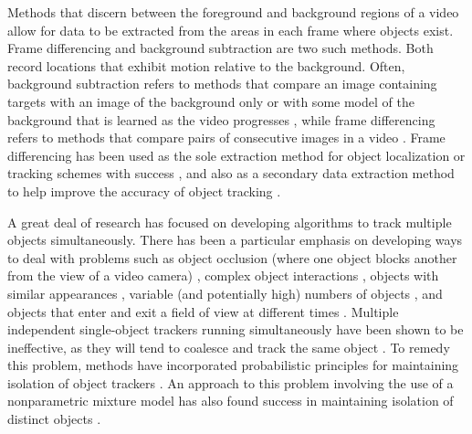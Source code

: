 \documentclass[twocolumn, final]{svjour3}
\begin{document}
Methods that discern between the foreground and background regions of a video allow for data to be extracted from the areas in each frame where objects exist. Frame differencing and background subtraction are two such methods. Both record locations that exhibit motion relative to the background. Often, background subtraction refers to methods that compare an image containing targets with an image of the background only or with some model of the background that is learned as the video progresses \cite{piccardi2004background}, while frame differencing refers to methods that compare pairs of consecutive images in a video \cite{zhang2001segmentation}. Frame differencing has been used as the sole extraction method for object localization or tracking schemes with success \citep{pece_2002, beleznai_2006, chu_2007}, and also as a secondary data extraction method to help improve the accuracy of object tracking \citep{perez_2002}.

A great deal of research has focused on developing algorithms to track multiple objects simultaneously. There has been a particular emphasis on developing ways to deal with problems such as object occlusion (where one object blocks another from the view of a video camera) \cite{senior2006appearance, cucchiara2004probabilistic, zhou2003background}, complex object interactions \cite{khan_2004, mckenna2000tracking, dockstader2001multiple}, objects with similar appearances \cite{maccormick1999probabilistic, jepson_2003}, variable (and potentially high) numbers of objects \cite{reilly2010detection}, and objects that enter and exit a field of view at different times \cite{stauffer2003estimating, nedrich2010learning}. Multiple independent single-object trackers running simultaneously have been shown to be ineffective, as they will tend to coalesce and track the same object \cite{khan_2004}. To remedy this problem, methods have incorporated probabilistic principles for maintaining isolation of object trackers \cite{maccormick1999probabilistic}. An approach to this problem involving the use of a nonparametric mixture model has also found success in maintaining isolation of distinct objects \cite{vermaak_2003}.
\end{document}
